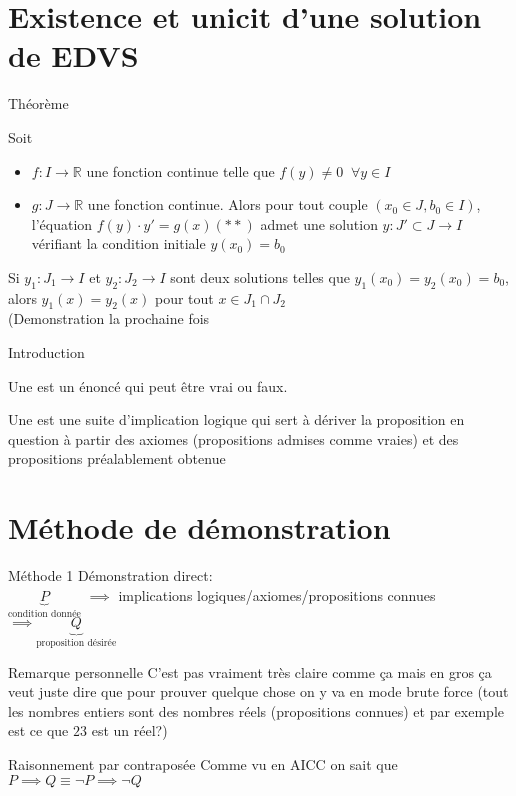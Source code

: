 \section{Existence et unicit d'une solution de EDVS}
\begin{parag}{Théorème}
    \begin{theoreme}
        Soit \begin{itemize}
            \item $f: I \to \mathbb{R}$ une fonction continue telle que $f(y) \neq 0\;\; \forall y \in I$
            \item $g : J \to \mathbb{R}$ une fonction continue. Alors pour tout couple $(x_0 \in J, b_0 \in I)$, l'équation $f(y)\cdot y' = g(x) (**)$ admet une solution $y : J' \subset J \to I$ vérifiant la condition initiale $y(x_0) = b_0$
        \end{itemize}
        Si $y_1 : J_1 \to I$ et $y_2 : J_2 \to I$ sont deux solutions telles que $y_1(x_0) = y_2(x_0) = b_0$, alors $y_1(x) = y_2(x)$ pour tout $x \in J_1 \cap J_2$
        \\
        (Demonstration la prochaine fois
        
    \end{theoreme}
\end{parag}
\begin{parag}{Introduction}
    \begin{definition}
        Une  est un énoncé qui peut être vrai ou faux.
    \end{definition}
    \begin{definition}
        Une  est une suite d'implication logique qui sert à dériver la proposition en question à partir des axiomes (propositions admises comme vraies) et des propositions préalablement obtenue
    \end{definition}
\end{parag}
\section{Méthode de démonstration}
\begin{parag}{Méthode 1}
    Démonstration direct:\\ $\underbrace{P}_{\text{condition donnée}}$ $\implies$ implications logiques/axiomes/propositions connues $\implies \underbrace{Q}_{\text{proposition désirée}}$
    \begin{subparag}{Remarque personnelle}
        C'est pas vraiment très claire comme ça mais en gros ça veut juste dire que pour prouver quelque chose on y va en mode brute force (tout les nombres entiers sont des nombres réels (propositions connues) et par exemple est ce que $23$ est un réel?) 
    \end{subparag}
\end{parag}
\begin{parag}{Raisonnement par contraposée}
    Comme vu en AICC on sait que $P \implies Q \equiv \neg P \implies \neg Q$
\end{parag}
